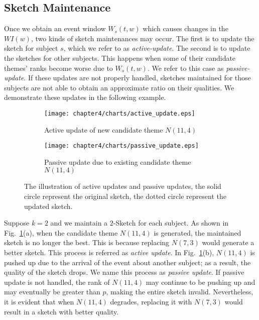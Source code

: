 \subsection{Sketch Maintenance}
\label{subsec:sketch_main}
Once we obtain an event window $W_s(t,w)$ which causes changes in the $WI(w)$, two kinds of sketch maintenances may occur. The first is 
to update the sketch for subject $s$, which we refer to as \emph{active-update}. The second is to update the sketches for other subjects. This happens when some of their candidate themes' ranks  become worse due to $W_s(t,w)$. We refer to this case as \emph{passive-update}. If these updates are not properly handled, sketches maintained for those subjects are not able to obtain an approximate ratio on their qualities. We demonstrate these updates in the following example.

\begin{figure}
	\centering
    \begin{subfigure}[b]{0.45\textwidth}
        \texttt{[image: chapter4/charts/active\_update.eps]}
        \caption{Active update of new candidate theme $N(11,4)$}
    \end{subfigure}
    \begin{subfigure}[b]{0.45\textwidth}
        \texttt{[image: chapter4/charts/passive\_update.eps]}
        \caption{Passive update due to existing candidate theme $N(11,4)$ }
    \end{subfigure}
    \caption{The illustration of active updates and passive updates, the solid circle represent the original
    sketch, the dotted circle represent the updated sketch.}
    \label{fig:sketch_maintenance}
\end{figure}


\begin{example}
Suppose $k = 2$ and we maintain a $2$-Sketch for each subject. As shown in Fig.~\ref{fig:sketch_maintenance}(a), 
when the candidate theme $N(11,4)$ is generated, the maintained sketch is no longer the best. This is because replacing 
$N(7,3)$ would generate a better sketch. This process is referred as \emph{active update}.
In Fig.~\ref{fig:sketch_maintenance}(b), $N(11,4)$ is pushed up due to the arrival of the event about another subject; as a result, the quality of the sketch drops. We name this process as \emph{passive update}. If passive update is not handled, the rank of $N(11,4)$ may continue to be pushing up and may eventually be greater than $p$, making the entire sketch invalid. Nevertheless, it is evident that when $N(11,4)$ degrades, replacing it with $N(7,3)$ would
result in a sketch with better quality. 
\end{example}

